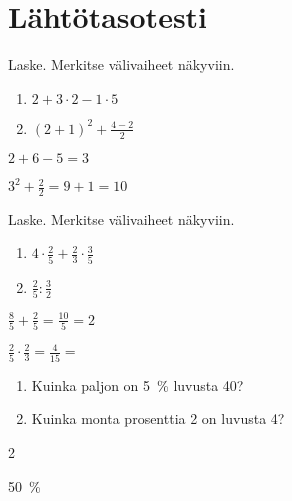 \section{Lähtötasotesti}


\begin{tehtava}
Laske. Merkitse välivaiheet näkyviin. 
\begin{enumerate}
\item $2+3\cdot 2-1\cdot5$
\item $(2+1)^2+\frac{4-2}{2}$
\end{enumerate}
\begin{vastaus}
\item $2+6-5=3$
\item $3^2+\frac{2}{2}=9+1=10$
\end{vastaus}
\end{tehtava}

\begin{tehtava}
Laske. Merkitse välivaiheet näkyviin. 
\begin{enumerate}
\item $4\cdot \frac{2}{5} + \frac{2}{3}\cdot \frac{3}{5}$
\item $\frac{2}{5} : \frac{3}{2}$
\end{enumerate}
\begin{vastaus}
\item $\frac{8}{5} + \frac{2}{5}=\frac{10}{5} = 2$
\item $\frac{2}{5} \cdot \frac{2}{3}=\frac{4}{15}=$
\end{vastaus}
\end{tehtava}

\begin{tehtava}
\begin{enumerate}
\item Kuinka paljon on 5~\% luvusta 40?
\item Kuinka monta prosenttia 2 on luvusta 4?
\end{enumerate}
\begin{vastaus}
\item 2
\item 50~\%
\end{vastaus}
\end{tehtava}

